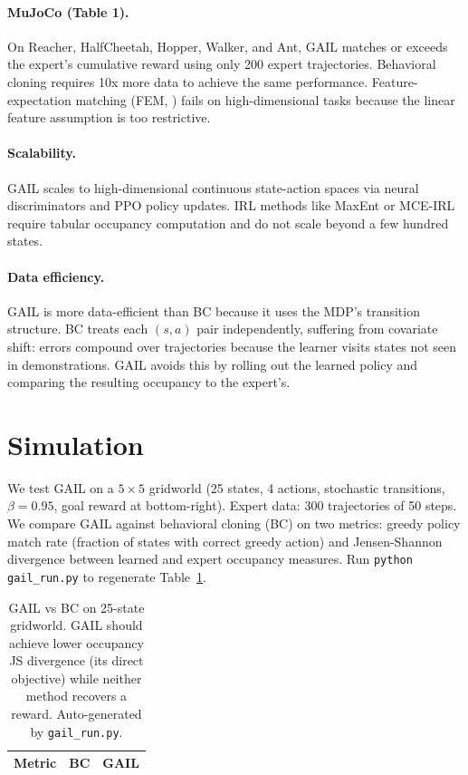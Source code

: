 \documentclass[11pt]{article}
\begin{document}
\paragraph{MuJoCo (Table 1).}
On Reacher, HalfCheetah, Hopper, Walker, and Ant, GAIL matches or exceeds the expert's cumulative reward using only 200 expert trajectories.
Behavioral cloning requires 10x more data to achieve the same performance.
Feature-expectation matching (FEM, \citealt{abbeelNg2004}) fails on high-dimensional tasks because the linear feature assumption is too restrictive.

\paragraph{Scalability.}
GAIL scales to high-dimensional continuous state-action spaces via neural discriminators and PPO policy updates.
IRL methods like MaxEnt or MCE-IRL require tabular occupancy computation and do not scale beyond a few hundred states.

\paragraph{Data efficiency.}
GAIL is more data-efficient than BC because it uses the MDP's transition structure.
BC treats each $(s,a)$ pair independently, suffering from covariate shift: errors compound over trajectories because the learner visits states not seen in demonstrations.
GAIL avoids this by rolling out the learned policy and comparing the resulting occupancy to the expert's.

\section{Simulation}

We test GAIL on a $5 \times 5$ gridworld (25 states, 4 actions, stochastic transitions, $\beta = 0.95$, goal reward at bottom-right).
Expert data: 300 trajectories of 50 steps.
We compare GAIL against behavioral cloning (BC) on two metrics: greedy policy match rate (fraction of states with correct greedy action) and Jensen-Shannon divergence between learned and expert occupancy measures.
Run \texttt{python gail\_run.py} to regenerate Table~\ref{tab:results}.

\begin{table}[h!]
\centering\small
\begin{tabular}{lrr}
\toprule
Metric & BC & GAIL \\
\midrule

\bottomrule
\end{tabular}
\caption{GAIL vs BC on 25-state gridworld. GAIL should achieve lower occupancy JS divergence (its direct objective) while neither method recovers a reward. Auto-generated by \texttt{gail\_run.py}.}
\label{tab:results}
\end{table}
\FloatBarrier
\end{document}
